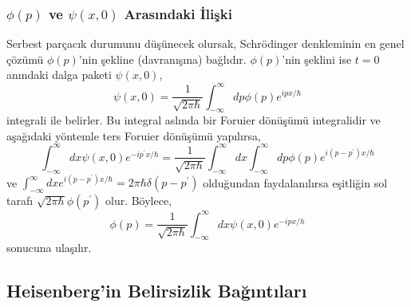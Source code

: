 \documentclass[a4paper,12pt, twoside]{article}
\begin{document}
\subsubsection{$\phi\left(p\right)$  ve $\psi\left( x,0\right)$ Arasındaki İlişki}

Serbest parçacık durumunu düşünecek olursak, Schrödinger denkleminin en genel çözümü $\phi(p)$'nin şekline (davranışına) bağlıdır. $\phi(p)$'nin şeklini ise $t=0$ anındaki dalga paketi $\psi(x,0)$,
\begin{equation}
\psi \left( x,0\right) =\dfrac {1}{\sqrt {2\pi \hbar }}\int ^{\infty }_{-\infty }dp\phi \left( p\right) e^{i px /\hbar }
\label{eq:wave_packet_in_t0}
\end{equation}
integrali ile belirler. Bu integral aslında bir Foruier dönüşümü integralidir ve aşağıdaki yöntemle ters Foruier dönüşümü yapılırsa,
\begin{equation}
\int _ { - \infty } ^ { \infty } d x \psi ( x , 0 ) e ^ { - i p ^ { \prime } x / \hbar } = \frac { 1 } { \sqrt { 2 \pi \hbar } } \int _ { - \infty } ^ { \infty } d x \int _ { - \infty } ^ { \infty } d p \phi ( p ) e ^ { i \left( p - p ^ { \prime } \right) x / \hbar }
\label{eq:wave_packet_in_p_t0}
\end{equation}
ve $\int _ { - \infty } ^ { \infty } d x e ^ { i \left( p - p ^ { \prime } \right) x/\hbar } = 2 \pi \hbar \delta \left( p - p ^ { \prime } \right)$ olduğundan faydalanılırsa eşitliğin sol tarafı $\sqrt { 2 \pi  \hbar } \phi \left( p ^ { \prime } \right)$ olur. Böylece,
\begin{equation}
\phi ( p ) = \frac { 1 } { \sqrt { 2 \pi \hbar } } \int _ { - \infty } ^ { \infty } d x \psi ( x , 0 ) e ^ { - i p x/ h }
\end{equation}
sonucuna ulaşılır. 

\subsection{Heisenberg'in Belirsizlik Bağıntıları}
\end{document}
